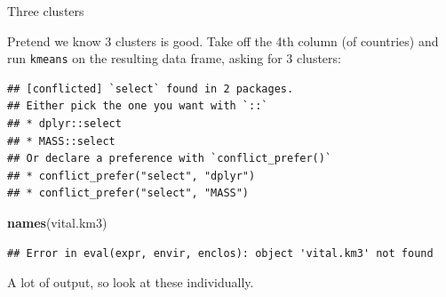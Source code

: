 \documentclass[ignorenonframetext,]{beamer}
\newenvironment{Shaded}{\begin{snugshade}}{\end{snugshade}}
\newcommand{\DecValTok}[1]{\textcolor[rgb]{0.00,0.00,0.81}{#1}}
\newcommand{\KeywordTok}[1]{\textcolor[rgb]{0.13,0.29,0.53}{\textbf{#1}}}
\newcommand{\NormalTok}[1]{#1}
\newcommand{\OperatorTok}[1]{\textcolor[rgb]{0.81,0.36,0.00}{\textbf{#1}}}
\newcommand{\StringTok}[1]{\textcolor[rgb]{0.31,0.60,0.02}{#1}}
\begin{document}
\begin{frame}[fragile]{Three clusters}
\protect\hypertarget{three-clusters}{}

Pretend we know 3 clusters is good. Take off the 4th column (of
countries) and run \texttt{kmeans} on the resulting data frame, asking
for 3 clusters:

\begin{Shaded}
\end{Shaded}

\begin{verbatim}
## [conflicted] `select` found in 2 packages.
## Either pick the one you want with `::` 
## * dplyr::select
## * MASS::select
## Or declare a preference with `conflict_prefer()`
## * conflict_prefer("select", "dplyr")
## * conflict_prefer("select", "MASS")
\end{verbatim}

\begin{Shaded}
\begin{Highlighting}[]
\KeywordTok{names}\NormalTok{(vital.km3)}
\end{Highlighting}
\end{Shaded}

\begin{verbatim}
## Error in eval(expr, envir, enclos): object 'vital.km3' not found
\end{verbatim}

A lot of output, so look at these individually.

\end{frame}
\end{document}
